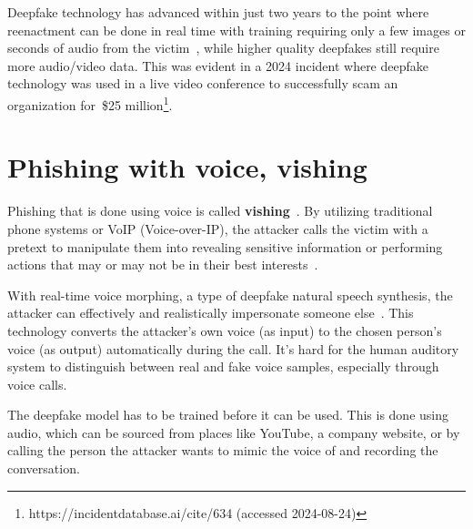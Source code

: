 Deepfake technology has advanced within just two years to the point where reenactment can be done in real time with training requiring only a few images or seconds of audio from the victim~\citep{mirsky_Threat_Offensive_AI_Organizations_2023}, while higher quality deepfakes still require more audio/video data. This was evident in a 2024 incident where deepfake technology was used in a live video conference to successfully scam an organization for~\$25 million\footnote{https://incidentdatabase.ai/cite/634 (accessed 2024-08-24)}.

















\section{Phishing with voice, vishing}
\begin{comment}
What to cover:
    - Including spear phishing with video in this section?
    

\end{comment}

Phishing that is done using voice is called \textbf{vishing}~\citep{doan_BTSE_Audio_Deepfake_Detection_2023}. By utilizing traditional phone systems or VoIP (Voice-over-IP), the attacker calls the victim with a pretext to manipulate them into revealing sensitive information or performing actions that may or may not be in their best interests~\citep{hadnagy_Social_Engineering_The_Science_2018}.



With real-time voice morphing, a type of deepfake natural speech synthesis, the attacker can effectively and realistically impersonate someone else~\citep{doan_BTSE_Audio_Deepfake_Detection_2023}. This technology converts the attacker's own voice (as input) to the chosen person's voice (as output) automatically during the call. It's hard for the human auditory system to distinguish between real and fake voice samples, especially through voice calls.

The deepfake model has to be trained before it can be used. This is done using audio, which can be sourced from places like YouTube, a company website, or by calling the person the attacker wants to mimic the voice of and recording the conversation.

